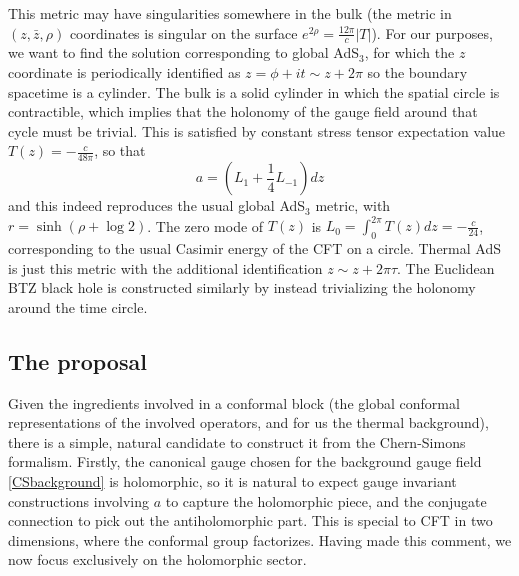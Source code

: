 \documentclass[12pt]{article}
\begin{document}
This metric may have singularities somewhere in the bulk (the metric in $(z,\bar{z},\rho)$ coordinates is singular on the surface $e^{2\rho} = \frac{12\pi}{c}|T|$). For our purposes, we want to find the solution corresponding to global AdS$_3$, for which the $z$ coordinate is periodically identified as $z=\phi+ i t \sim z+2\pi$ so the boundary spacetime is a cylinder. The bulk is a solid cylinder in which the spatial circle is contractible, which implies that the holonomy of the gauge field around that cycle must be trivial. This is satisfied by constant stress tensor expectation value $T(z)=-\frac{c}{48\pi}$, so that
\begin{equation}
	a= \left(L_1 +\frac{1}{4}L_{-1}\right)dz
\end{equation}
and this indeed reproduces the usual global AdS$_3$ metric, with $r=\sinh(\rho+\log 2)$.
The zero mode of $T(z)$ is $L_0=\int_0^{2\pi} T(z)dz =-\frac{c}{24}$, corresponding to the usual Casimir energy of the CFT on a circle. Thermal AdS is just this metric with the additional identification $z\sim z+2\pi\tau$. The Euclidean BTZ black hole is constructed similarly by instead trivializing the holonomy around the time circle.

\subsection{The proposal}

Given the ingredients involved in a conformal block (the global conformal representations of the involved operators, and for us the thermal background), there is a simple, natural candidate to construct it from the Chern-Simons formalism. Firstly, the canonical gauge chosen for the background gauge field \cref{CSbackground} is holomorphic, so it is natural to expect gauge invariant constructions involving $a$ to capture the holomorphic piece, and the conjugate connection to pick out the antiholomorphic part. This is special to CFT in two dimensions, where the conformal group factorizes. Having made this comment, we now focus exclusively on the holomorphic sector.
\end{document}
